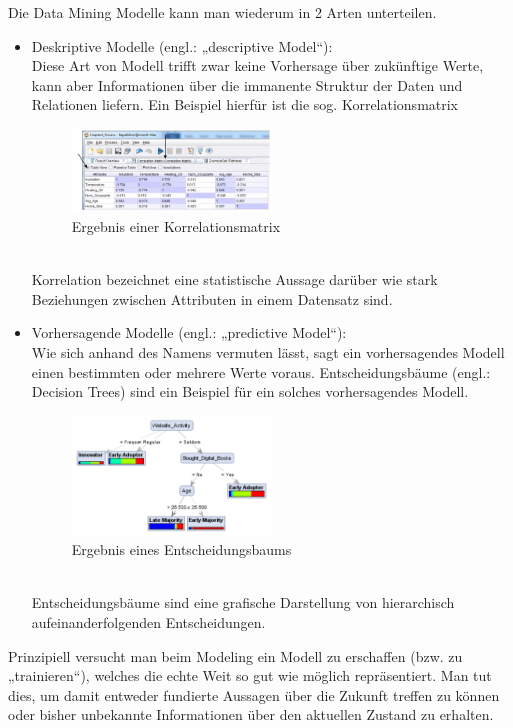 Die Data Mining Modelle kann man wiederum in 2 Arten unterteilen.
\begin{itemize}
  \item Deskriptive Modelle (engl.: „descriptive Model“): \\
  Diese Art von Modell trifft zwar keine Vorhersage über zukünftige Werte, kann
  aber Informationen über die immanente Struktur der Daten und Relationen
  liefern. Ein Beispiel hierfür ist die sog. Korrelationsmatrix
  \begin{figure}[htb]
    \centering
  	\includegraphics[width=0.5\textwidth]{gfx/correlationmatrix.png}
  	\caption{Ergebnis einer Korrelationsmatrix \cite{North:2012}}
  	\label{fig:process:crispdm:mod:cm}
  \end{figure}
  \\
  Korrelation bezeichnet eine statistische Aussage darüber wie stark Beziehungen
  zwischen Attributen in einem Datensatz sind.
  \item Vorhersagende Modelle (engl.: „predictive Model“): \\
  Wie sich anhand des Namens vermuten lässt, sagt ein vorhersagendes Modell
  einen bestimmten oder mehrere Werte voraus. Entscheidungsbäume (engl.: Decision
  Trees) sind ein Beispiel für ein solches vorhersagendes Modell.
  \pagebreak
  \begin{figure}[htb]
    \centering
  	\includegraphics[width=0.5\textwidth]{gfx/dectree.png}
  	\caption{Ergebnis eines Entscheidungsbaums \cite{North:2012}}
  	\label{fig:process:crispdm:mod:dt}
  \end{figure}
  \\
  Entscheidungsbäume sind eine grafische Darstellung von  hierarchisch
  aufeinanderfolgenden Entscheidungen.
\end{itemize}
Prinzipiell versucht man beim Modeling ein Modell zu erschaffen (bzw. zu
„trainieren“), welches die echte Weit so gut wie möglich repräsentiert. Man tut
dies, um damit entweder fundierte Aussagen über die Zukunft treffen zu können
oder bisher unbekannte Informationen über den aktuellen Zustand zu erhalten.

